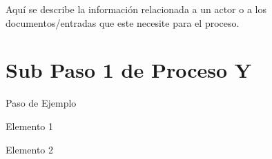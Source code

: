 Aquí se describe la información relacionada a un actor o a los documentos/entradas que este necesite para el proceso.
\chapter{Sub Paso 1 de Proceso Y}
\begin{UMStep}{Paso de Ejemplo}
	\item Elemento 1
	\item Elemento 2
\end{UMStep}